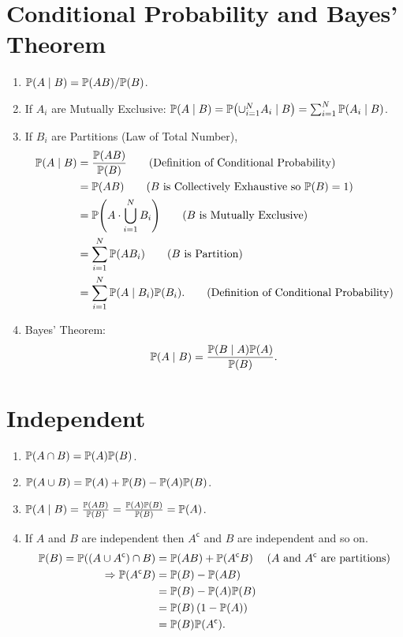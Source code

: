 \section{Conditional Probability and Bayes' Theorem}
\begin{enumerate}
    \item $\condP{A}{B} = \P{AB}/\P{B}$.
    \item If $A_i$ are Mutually Exclusive: $\condP{A}{B} = \condP{\cup_{i=1}^{N}A_i}{B} = \sum_{i=1}^{N}\condP{A_i}{B}$.
    \item If $B_i$ are Partitions (Law of Total Number),
    \begin{align}
        \condP{A}{B}
        &= \frac{\P{AB}}{\P{B}}  \tag{Definition of Conditional Probability}\\
        &= \P{AB}  \tag{$B$ is Collectively Exhaustive so $\P{B}=1$} \\
        &= \P{A\cdot\bigcup\limits_{i=1}^{N}B_i}  \tag{$B$ is Mutually Exclusive} \\
        &= \sum_{i=1}^{N}\P{AB_i}  \tag{$B$ is Partition} \\
        &= \sum_{i=1}^{N}\condP{A}{B_i}\P{B_i}. \tag{Definition of Conditional Probability}
    \end{align}
\item Bayes' Theorem:{
    \begin{equation*}
        \condP{A}{B} = \frac{\condP{B}{A}\P{A}}{\P{B}}.
    \end{equation*}
}
\end{enumerate}
\section{Independent}
    \begin{enumerate}
        \item $\P{A\cap B}=\P{A}\P{B}$.
        \item $\P{A \cup B} = \P{A}+\P{B}-\P{A}\P{B}$.
        \item $\condP{A}{B} = \frac{\P{AB}}{\P{B}}=\frac{\P{A}\P{B}}{\P{B}}=\P{A}$.
        \item If $A$ and $B$ are independent then $A^{\mathsf{c}}$ and $B$ are independent and so on.{
            \begin{align*}
                \P{B} = \P{(A\cup A^{\mathsf{c}})\cap B}
                &= \P{AB}+\P{A^{\mathsf{c}}B} && \text{($A$ and $A^\mathsf{c}$ are partitions)}\\
                \Rightarrow \P{A^{\mathsf{c}}B}
                &= \P{B}-\P{AB} \\
                &= \P{B}-\P{A}\P{B} \\
                &= \P{B}\left(1-\P{A}\right) \\
                &= \P{B}\P{A^{\mathsf{c}}}.
            \end{align*}
        }
    \end{enumerate}